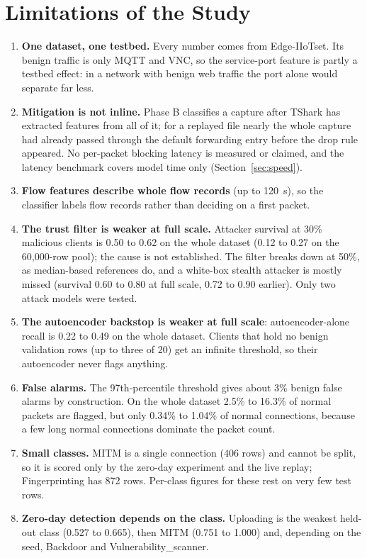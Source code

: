 \section{Limitations of the Study}\label{sec:limits}
\begin{enumerate}
  \item \textbf{One dataset, one testbed.} Every number comes from Edge-IIoTset. Its benign traffic is only MQTT and VNC, so the service-port feature is partly a testbed effect: in a network with benign web traffic the port alone would separate far less.
  \item \textbf{Mitigation is not inline.} Phase B classifies a capture after TShark has extracted features from all of it; for a replayed file nearly the whole capture had already passed through the default forwarding entry before the drop rule appeared. No per-packet blocking latency is measured or claimed, and the latency benchmark covers model time only (Section~\ref{sec:speed}).
  \item \textbf{Flow features describe whole flow records} (up to 120~s), so the classifier labels flow records rather than deciding on a first packet.
  \item \textbf{The trust filter is weaker at full scale.} Attacker survival at 30\% malicious clients is 0.50 to 0.62 on the whole dataset (0.12 to 0.27 on the 60{,}000-row pool); the cause is not established. The filter breaks down at 50\%, as median-based references do, and a white-box stealth attacker is mostly missed (survival 0.60 to 0.80 at full scale, 0.72 to 0.90 earlier). Only two attack models were tested.
  \item \textbf{The autoencoder backstop is weaker at full scale}: autoencoder-alone recall is 0.22 to 0.49 on the whole dataset. Clients that hold no benign validation rows (up to three of 20) get an infinite threshold, so their autoencoder never flags anything.
  \item \textbf{False alarms.} The 97th-percentile threshold gives about 3\% benign false alarms by construction. On the whole dataset 2.5\% to 16.3\% of normal packets are flagged, but only 0.34\% to 1.04\% of normal connections, because a few long normal connections dominate the packet count.
  \item \textbf{Small classes.} MITM is a single connection (406 rows) and cannot be split, so it is scored only by the zero-day experiment and the live replay; Fingerprinting has 872 rows. Per-class figures for these rest on very few test rows.
  \item \textbf{Zero-day detection depends on the class.} Uploading is the weakest held-out class (0.527 to 0.665), then MITM (0.751 to 1.000) and, depending on the seed, Backdoor and Vulnerability\_scanner.

\end{enumerate}
